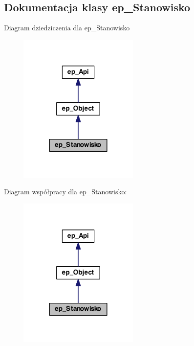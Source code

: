 \hypertarget{classep___stanowisko}{\subsection{Dokumentacja klasy ep\-\_\-\-Stanowisko}
\label{classep___stanowisko}
}


Diagram dziedziczenia dla ep\-\_\-\-Stanowisko\nopagebreak
\begin{figure}[H]
\begin{center}
\leavevmode
\includegraphics[width=168pt]{classep___stanowisko__inherit__graph}
\end{center}
\end{figure}


Diagram współpracy dla ep\-\_\-\-Stanowisko\-:\nopagebreak
\begin{figure}[H]
\begin{center}
\leavevmode
\includegraphics[width=168pt]{classep___stanowisko__coll__graph}
\end{center}
\end{figure}
